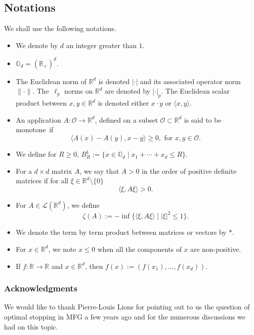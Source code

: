 \documentclass[JEP,XML,SOM,Unicode,NoEqCountersInSection,published]{cedram}
\let\mathcal\mathscr
\let\sep\mid
\theoremstyle{definition}
\begin{document}
\subsection*{Notations}
We shall use the following notations.
\begin{itemize}
\item We denote by $d$ an integer greater than $1$.
\item $\mathbb{O}_d = (\mathbb{R}_+)^d$.
\item The Euclidean norm of $\mathbb{R}^d$ is denoted $|{\cdot}|$ and its associated operator norm $\|{\cdot}\|$. The~$\ell_p$ norms on $\mathbb{R}^d$ are denoted by $|{\cdot}|_p$. The Euclidean scalar product between \hbox{$x,y \in \mathbb{R}^d$} is denoted either $x \cdot y$ or $\langle x, y \rangle$.
\item An application $A: \mathcal{O} \to \mathbb{R}^d$, defined on a subset $\mathcal{O} \subset \mathbb{R}^d$ is said to be monotone~if
\begin{equation*}
\langle A(x)- A(y) , x-y \rangle \geq 0, \text{ for } x,y \in \mathcal{O}.
\end{equation*}
\item We define for $R\geq 0$, $B^1_R:= \{ x \in \mathbb{O}_d\sep x_1+\cdots+x_d \leq R\}$.
\item For a $d\times d$ matrix $A$, we say that $A > 0$ in the order of positive definite matrices if for all $\xi \in \mathbb{R}^d\setminus \{0\}$
\[
\langle \xi, A \xi \rangle > 0.
\]
\item For $A \in \mathcal{L}(\mathbb{R}^d)$, we define
\begin{equation*}
\zeta(A):= -\inf \{ \langle \xi, A\xi\rangle \sep |\xi|^2 \leq 1\}.
\end{equation*}
\item We denote the term by term product between matrices or vectors by $*$.
\item For $x \in \mathbb{R}^d$, we note $x\leq 0$ when all the components of $x$ are non-positive.
\item If $f: \mathbb{R} \to \mathbb{R}$ and $x\in \mathbb{R}^d$, then $f(x):= (f(x_1),\dots,f(x_d))$.
\end{itemize}

\subsubsection*{Acknowledgments}
We would like to thank Pierre-Louis Lions for pointing out to us the question of optimal stopping in MFG a few years ago and for the numerous discussions we had on this topic.
\end{document}
